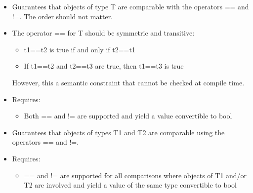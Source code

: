 \begin{itemize}
\item
Guarantees that objects of type T are comparable with the operators == and !=. The order should not matter.

\item
The operator == for T should be symmetric and transitive:
\begin{itemize}
\item
t1==t2 is true if and only if t2==t1

\item
If t1==t2 and t2==t3 are true, then t1==t3 is true
\end{itemize}

However, this a semantic constraint that cannot be checked at compile time.

\item
Requires:
\begin{itemize}
\item
Both == and != are supported and yield a value convertible to bool
\end{itemize}
\end{itemize}


\begin{itemize}
\item
Guarantees that objects of types T1 and T2 are comparable using the operators == and !=.

\item
Requires:
\begin{itemize}
\item
== and != are supported for all comparisons where objects of T1 and/or T2 are involved and yield a value of the same type convertible to bool
\end{itemize}
\end{itemize}


